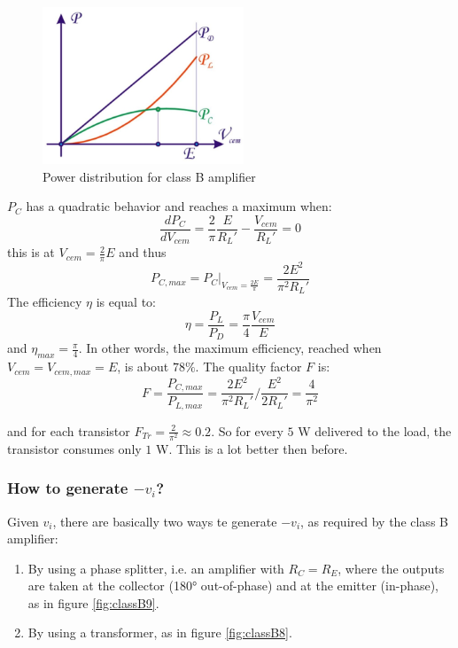\begin{figure}[h!]
	\centering
	\includegraphics[width=6cm]{figures/ch09/classB7.jpg}
	\caption{Power distribution for class B amplifier}
	\label{fig:classB7}
\end{figure}

$P_C$ has a quadratic behavior and reaches a maximum when:
$$
\frac{dP_C}{dV_{cem}} =  \frac{2}{\pi} \frac{E}{R_L'} - \frac{V_{cem}}{R_L'} = 0
$$
this is at $V_{cem} = \frac{2}{\pi} E$ and thus 
$$P_{C, max} = P_C \big|_{V_{cem} = \frac{2E}{\pi}} = \frac{2E^2}{\pi^2 R_L'}$$
The efficiency $\eta$ is equal to:
$$
\eta = \frac{P_L}{P_D} = \frac{\pi}{4} \frac{V_{cem}}{E} 
$$
and $\eta_{max} = \frac{\pi}{4}$. In other words, the maximum efficiency, reached when $V_{cem} = V_{cem, max} = E$, is about $78\%$. The quality factor $F$ is:
$$F = \frac{P_{C, max}}{P_{L, max}} = \frac{2E^2}{\pi^2 R_L'} / \frac{E^2}{2R_L'} =   \frac{4}{\pi^2}$$

and for each transistor $F_{Tr} = \frac{2}{\pi^2}  \approx 0.2$. So for every $5$ W delivered to the load, the transistor consumes only $1$ W. This is a lot better then before.
\subsubsection{How to generate $-v_i$\;?}
Given $v_i$, there are basically two ways te generate $-v_i$, as required by the class B amplifier:
\begin{enumerate}
	\item By using a phase splitter, i.e. an amplifier with $R_C = R_E$, where the outputs are taken at the collector (180° out-of-phase) and at the emitter (in-phase), as in figure \ref{fig:classB9}.
	\item By using a transformer, as in figure \ref{fig:classB8}.
\end{enumerate}

